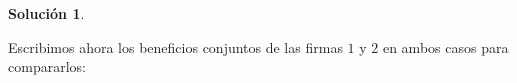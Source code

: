 \documentclass[a4paper, 11pt]{article}
\theoremstyle{definition}
\newtheorem{solucion}{Soluci\'on}
\begin{document}
\begin{solucion}
\begin{enumerate}
\begin{enumerate}





Escribimos ahora los beneficios conjuntos de las firmas $1$ y $2$ en ambos casos para compararlos:


\end{enumerate}
\end{enumerate}
\end{solucion}
\end{document}
